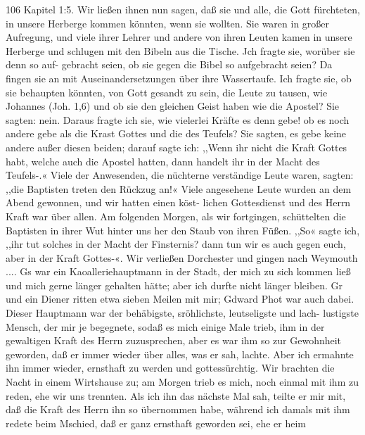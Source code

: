 106 Kapitel 1:5.
Wir ließen ihnen nun sagen, daß sie und alle, die Gott fürchteten,
in unsere Herberge kommen könnten, wenn sie wollten. Sie
waren in großer Aufregung, und viele ihrer Lehrer und andere
von ihren Leuten kamen in unsere Herberge und schlugen mit den
Bibeln aus die Tische. Jch fragte sie, worüber sie denn so auf-
gebracht seien, ob sie gegen die Bibel so aufgebracht seien? Da
fingen sie an mit Auseinandersetzungen über ihre Wassertaufe.
Ich fragte sie, ob sie behaupten könnten, von Gott gesandt zu
sein, die Leute zu tausen, wie Johannes (Joh. 1,6) und ob sie
den gleichen Geist haben wie die Apostel? Sie sagten: nein.
Daraus fragte ich sie, wie vielerlei Kräfte es denn gebe! ob es
noch andere gebe als die Krast Gottes und die des Teufels?
Sie sagten, es gebe keine andere außer diesen beiden; darauf
sagte ich: ,,Wenn ihr nicht die Kraft Gottes habt, welche auch
die Apostel hatten, dann handelt ihr in der Macht des Teufels-.«
Viele der Anwesenden, die nüchterne verständige Leute waren,
sagten: ,,die Baptisten treten den Rückzug an!« Viele angesehene
Leute wurden an dem Abend gewonnen, und wir hatten einen köst-
lichen Gottesdienst und des Herrn Kraft war über allen. Am
folgenden Morgen, als wir fortgingen, schüttelten die Baptisten in
ihrer Wut hinter uns her den Staub von ihren Füßen. ,,So«
sagte ich, ,,ihr tut solches in der Macht der Finsternis? dann tun
wir es auch gegen euch, aber in der Kraft Gottes-«.
Wir verließen Dorchester und gingen nach Weymouth ....
Gs war ein Kaoalleriehauptmann in der Stadt, der mich zu sich
kommen ließ und mich gerne länger gehalten hätte; aber ich
durfte nicht länger bleiben. Gr und ein Diener ritten etwa
sieben Meilen mit mir; Gdward Phot war auch dabei. Dieser
Hauptmann war der behäbigste, sröhlichste, leutseligste und lach-
lustigste Mensch, der mir je begegnete, sodaß es mich einige Male
trieb, ihm in der gewaltigen Kraft des Herrn zuzusprechen, aber
es war ihm so zur Gewohnheit geworden, daß er immer wieder
über alles, was er sah, lachte. Aber ich ermahnte ihn immer
wieder, ernsthaft zu werden und gottessürchtig. Wir brachten die
Nacht in einem Wirtshause zu; am Morgen trieb es mich, noch
einmal mit ihm zu reden, ehe wir uns trennten. Als ich ihn
das nächste Mal sah, teilte er mir mit, daß die Kraft des Herrn
ihn so übernommen habe, während ich damals mit ihm redete
beim Mschied, daß er ganz ernsthaft geworden sei, ehe er heim


